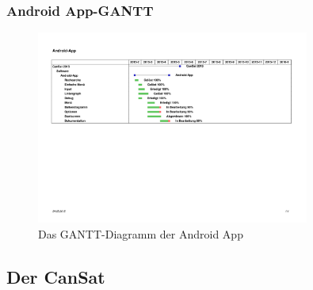 \subsubsection {Android App-GANTT}
\begin{figure}[H]
	\centering
	\includegraphics[trim = 30mm 200mm 45mm 40mm, clip,width=0.8\textwidth]{8_Anhang/android-app-gantt.png}
	\caption{Das GANTT-Diagramm der Android App}
	\label{gantt_hardware_3}
\end{figure}

\newpage
\vspace{-2cm}
\subsection{Der CanSat}

